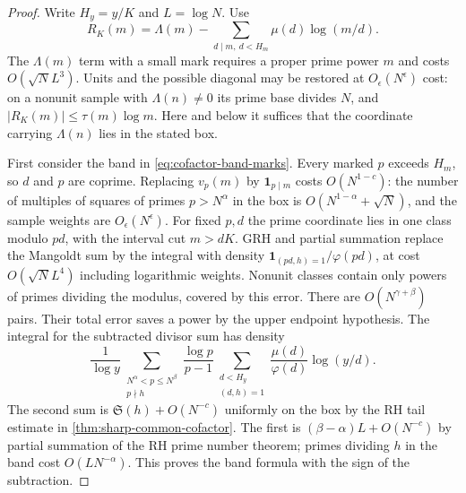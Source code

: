 \documentclass[11pt,a4paper]{article}
\numberwithin{equation}{section}
\newcommand{\SSS}{\mathfrak S}
\begin{document}
\begin{proof}
Write $H_y=y/K$ and $L=\log N$. Use
\[
 R_K(m)=\Lambda(m)-\sum_{d\mid m,\ d<H_m}\mu(d)\log(m/d).
\]
The $\Lambda(m)$ term with a small mark requires a proper prime
power $m$ and costs $O(\sqrt N L^3)$. Units and the possible
diagonal may be restored at $O_\epsilon(N^\epsilon)$ cost:
on a nonunit sample with $\Lambda(n)\ne0$ its prime base divides
$N$, and $|R_K(m)|\le\tau(m)\log m$. Here and
below it suffices that the coordinate carrying $\Lambda(n)$
lies in the stated box.

First consider the band in \eqref{eq:cofactor-band-marks}.
Every marked $p$ exceeds $H_m$, so $d$ and $p$ are coprime.
Replacing $v_p(m)$ by $\mathbf1_{p\mid m}$ costs
$O(N^{1-c})$: the number of multiples of squares of primes
$p>N^\alpha$ in the box is $O(N^{1-\alpha}+\sqrt N)$, and
the sample weights are $O_\epsilon(N^\epsilon)$.
For fixed $p,d$ the prime coordinate lies in one class modulo
$pd$, with the interval cut $m>dK$. GRH and partial summation
replace the Mangoldt sum by the integral with density
$\mathbf1_{(pd,h)=1}/\varphi(pd)$, at cost $O(\sqrt N L^4)$
including logarithmic weights. Nonunit classes contain only
powers of primes dividing the modulus, covered by this error.
There are $O(N^{\gamma+\beta})$ pairs. Their total error saves a
power by the upper endpoint hypothesis. The integral for the
subtracted divisor sum has density
\[
 \frac{1}{\log y}
 \sum_{\substack{N^\alpha<p\le N^\beta\\p\nmid h}}
     \frac{\log p}{p-1}
 \sum_{\substack{d<H_y\\(d,h)=1}}\frac{\mu(d)}{\varphi(d)}
                                      \log(y/d).
\]
The second sum is $\SSS(h)+O(N^{-c})$ uniformly on the box
by the RH tail estimate in \cref{thm:sharp-common-cofactor}.
The first is $(\beta-\alpha)L+O(N^{-c})$ by partial summation
of the RH prime number theorem; primes dividing $h$ in the
band cost $O(LN^{-\alpha})$. This proves the band formula with
the sign of the subtraction.


\end{proof}
\end{document}
